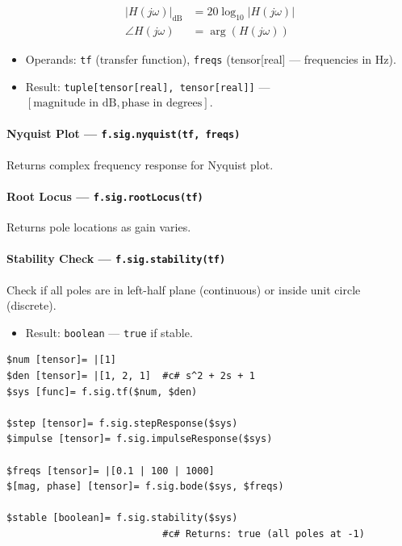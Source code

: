 \begin{align}
|H(j\omega)|_{\text{dB}} &= 20 \log_{10}|H(j\omega)| \label{eq:sig-bode-mag} \\
\angle H(j\omega) &= \arg(H(j\omega)) \label{eq:sig-bode-phase}
\end{align}

\begin{itemize}
\item Operands: \texttt{tf} (transfer function), \texttt{freqs} (tensor[real] --- frequencies in Hz).
\item Result: \texttt{tuple[tensor[real], tensor[real]]} --- $[\text{magnitude in dB}, \text{phase in degrees}]$.
\end{itemize}

\paragraph{Nyquist Plot --- \texttt{f.sig.nyquist(tf, freqs)}}
Returns complex frequency response for Nyquist plot.

\paragraph{Root Locus --- \texttt{f.sig.rootLocus(tf)}}
Returns pole locations as gain varies.

\paragraph{Stability Check --- \texttt{f.sig.stability(tf)}}
Check if all poles are in left-half plane (continuous) or inside unit circle (discrete).

\begin{itemize}
\item Result: \texttt{boolean} --- \texttt{true} if stable.
\end{itemize}

\begin{verbatim}
$num [tensor]= |[1]
$den [tensor]= |[1, 2, 1]  #c# s^2 + 2s + 1
$sys [func]= f.sig.tf($num, $den)

$step [tensor]= f.sig.stepResponse($sys)
$impulse [tensor]= f.sig.impulseResponse($sys)

$freqs [tensor]= |[0.1 | 100 | 1000]
$[mag, phase] [tensor]= f.sig.bode($sys, $freqs)

$stable [boolean]= f.sig.stability($sys)
                           #c# Returns: true (all poles at -1)
\end{verbatim}

